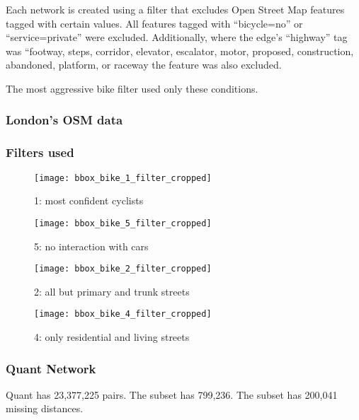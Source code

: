 Each network is created using a filter that excludes Open Street Map features tagged with certain values. All features tagged with ``bicycle=no'' or ``service=private'' were excluded. Additionally, where the edge's ``highway'' tag was ``footway, steps, corridor, elevator, escalator, motor, proposed, construction, abandoned, platform, or raceway the feature was also excluded. 

The most aggressive bike filter used only these conditions.


\subsubsection{London's OSM data}

\subsubsection{Filters used}

\begin{figure}
  \centering
  \texttt{[image: bbox\_bike\_1\_filter\_cropped]}
  \caption{1: most confident cyclists}
  \label{fig:sub1}
\end{figure}

\begin{figure}
  \centering
  \texttt{[image: bbox\_bike\_5\_filter\_cropped]}
  \caption{5: no interaction with cars }
  \label{fig:sub2}
\end{figure}



\begin{figure}
  \centering
  \texttt{[image: bbox\_bike\_2\_filter\_cropped]}
  \caption{2: all but primary and trunk streets}
  \label{fig:sub2}
\end{figure}



\begin{figure}
  \centering
  \texttt{[image: bbox\_bike\_4\_filter\_cropped]}
  \caption{4: only residential and living streets}
  \label{fig:sub2}
\end{figure}


\subsubsection{Quant Network}

Quant has 23,377,225 pairs. The subset has 799,236. The subset has 200,041 missing distances. 

